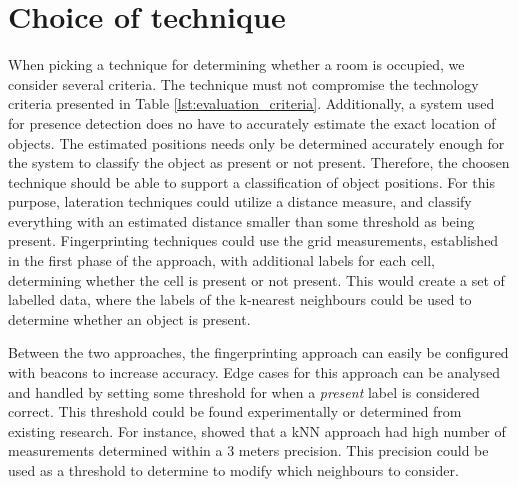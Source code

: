 \section{Choice of technique}
When picking a technique for determining whether a room is occupied, we consider several criteria.
The technique must not compromise the technology criteria presented in Table \ref{lst:evaluation_criteria}.
Additionally, a system used for presence detection does no have to accurately estimate the exact location of objects.
The estimated positions needs only be determined accurately enough for the system to classify the object as present or not present.
Therefore, the choosen technique should be able to support a classification of object positions.  
For this purpose, lateration techniques could utilize a distance measure, and classify everything with an estimated distance smaller than some threshold as being present.
Fingerprinting techniques could use the grid measurements, established in the first phase of the approach, with additional labels for each cell, determining whether the cell is present or not present.
This would create a set of labelled data, where the labels of the k-nearest neighbours could be used to determine whether an object is present. 

Between the two approaches, the fingerprinting approach can easily be configured with beacons to increase accuracy.
Edge cases for this approach can be analysed and handled by setting some threshold for when a \textit{present} label is considered correct. 
This threshold could be found experimentally or determined from existing research. 
For instance, \citeauthor{ble_kneares_neural}\cite{ble_kneares_neural} showed that a kNN approach had high number of measurements determined within a 3 meters precision. 
This precision could be used as a threshold to determine to modify which neighbours to consider.    


